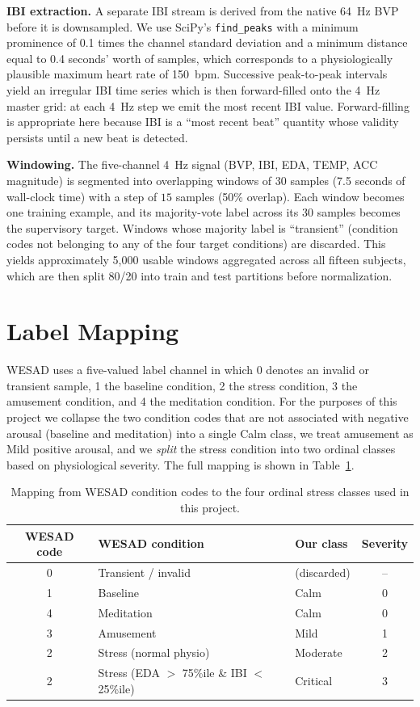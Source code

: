 \textbf{IBI extraction.} A separate IBI stream is derived from the
native 64~Hz BVP before it is downsampled. We use SciPy's
\texttt{find\_peaks} with a minimum prominence of 0.1 times the
channel standard deviation and a minimum distance equal to 0.4
seconds' worth of samples, which corresponds to a physiologically
plausible maximum heart rate of 150~bpm. Successive peak-to-peak
intervals yield an irregular IBI time series which is then
forward-filled onto the 4~Hz master grid: at each 4~Hz step we emit
the most recent IBI value. Forward-filling is appropriate here
because IBI is a ``most recent beat'' quantity whose validity
persists until a new beat is detected.

\textbf{Windowing.} The five-channel 4~Hz signal (BVP, IBI, EDA, TEMP,
ACC magnitude) is segmented into overlapping windows of $30$ samples
(7.5 seconds of wall-clock time) with a step of $15$ samples (50\%
overlap). Each window becomes one training example, and its
majority-vote label across its 30 samples becomes the supervisory
target. Windows whose majority label is ``transient''
(condition codes not belonging to any of the four target conditions)
are discarded. This yields approximately 5{,}000 usable windows
aggregated across all fifteen subjects, which are then split 80/20
into train and test partitions before normalization.

\section{Label Mapping}
\label{sec:m-labels}

WESAD uses a five-valued label channel in which 0 denotes an
invalid or transient sample, 1 the baseline condition, 2 the
stress condition, 3 the amusement condition, and 4 the meditation
condition. For the purposes of this project we collapse the two
condition codes that are not associated with negative arousal
(baseline and meditation) into a single Calm class, we treat
amusement as Mild positive arousal, and we \emph{split} the stress
condition into two ordinal classes based on physiological severity.
The full mapping is shown in Table~\ref{tab:label-map}.

\begin{table}[H]
\centering
\caption{Mapping from WESAD condition codes to the four ordinal
stress classes used in this project.}
\label{tab:label-map}
\small
\begin{tabular}{cp{6cm}lc}
\toprule
\textbf{WESAD code} & \textbf{WESAD condition} & \textbf{Our class} &
\textbf{Severity} \\
\midrule
0 & Transient / invalid & (discarded) & -- \\
1 & Baseline            & Calm        & 0 \\
4 & Meditation          & Calm        & 0 \\
3 & Amusement           & Mild        & 1 \\
2 & Stress (normal physio) & Moderate & 2 \\
2 & Stress (EDA $>$ 75\%ile \& IBI $<$ 25\%ile) & Critical & 3 \\
\bottomrule
\end{tabular}
\end{table}

